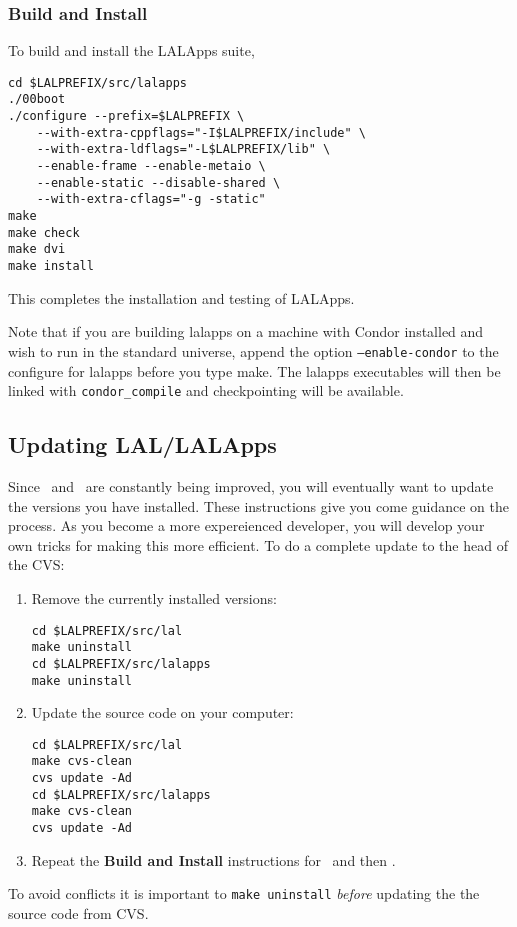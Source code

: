 \subsubsection{Build and Install}
To build and install the LALApps suite, 
\begin{verbatim}
cd $LALPREFIX/src/lalapps
./00boot
./configure --prefix=$LALPREFIX \
    --with-extra-cppflags="-I$LALPREFIX/include" \
    --with-extra-ldflags="-L$LALPREFIX/lib" \
    --enable-frame --enable-metaio \
    --enable-static --disable-shared \
    --with-extra-cflags="-g -static"
make
make check
make dvi
make install
\end{verbatim}
This completes the installation and testing of LALApps.  

Note that if you are building lalapps on a machine with Condor installed and
wish to run in the standard universe, append the option
\texttt{--enable-condor} to the configure for lalapps before you type make.
The lalapps executables will then be linked with \texttt{condor\_compile} and
checkpointing will be available.

\color{black}
\subsection{Updating LAL/LALApps}
\color{black}

Since \lal\ and \lalapps\ are constantly being improved,  you will
eventually want to update the versions you have installed.   These
instructions give you come guidance on the process.   As you become a
more expereienced developer,  you will develop your own tricks for
making this more efficient.    To do a complete update to the head of
the CVS:
\begin{enumerate}
\item Remove the currently installed versions:
\begin{verbatim}
cd $LALPREFIX/src/lal
make uninstall
cd $LALPREFIX/src/lalapps
make uninstall
\end{verbatim}

\item Update the source code on your computer:
\begin{verbatim}
cd $LALPREFIX/src/lal
make cvs-clean
cvs update -Ad
cd $LALPREFIX/src/lalapps
make cvs-clean
cvs update -Ad
\end{verbatim}

\item Repeat the \textbf{Build and Install} instructions for \lal\ and then
\lalapps.
\end{enumerate}
To avoid conflicts it is important to \texttt{make uninstall} \emph{before}
updating the the source code from CVS.
